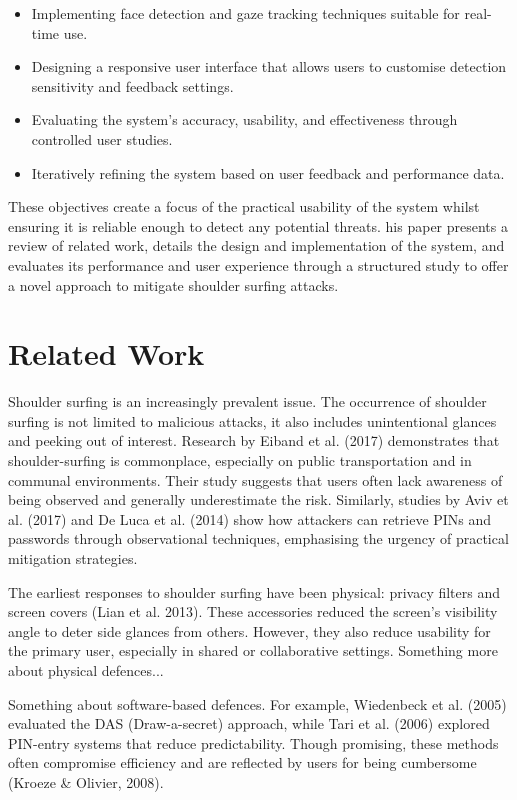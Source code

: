 \documentclass[12pt]{article}
\theoremstyle{plain}
\theoremstyle{definition}
\begin{document}
\begin{itemize}
  \item Implementing face detection and gaze tracking techniques suitable for real-time use.
  \item Designing a responsive user interface that allows users to customise detection sensitivity and feedback settings.
  \item Evaluating the system’s accuracy, usability, and effectiveness through controlled user studies.
  \item Iteratively refining the system based on user feedback and performance data.
\end{itemize}

These objectives create a focus of the practical usability of the system whilst ensuring it is reliable enough to detect any potential threats. his paper presents a review of related work, details the design and implementation of the system, and evaluates its performance and user experience through a structured study to offer a novel approach to mitigate shoulder surfing attacks.

\section{Related Work}
\label{sec:Related Work} 

Shoulder surfing is an increasingly prevalent issue. The occurrence of shoulder surfing is not limited to malicious attacks, it also includes unintentional glances and peeking out of interest. Research by Eiband et al. (2017) demonstrates that shoulder-surfing is commonplace, especially on public transportation and in communal environments. Their study suggests that users often lack awareness of being observed and generally underestimate the risk. Similarly, studies by Aviv et al. (2017) and De Luca et al. (2014) show how attackers can retrieve PINs and passwords through observational techniques, emphasising the urgency of practical mitigation strategies.

The earliest responses to shoulder surfing have been physical: privacy filters and screen covers (Lian et al. 2013). These accessories reduced the screen’s visibility angle to deter side glances from others. However, they also reduce usability for the primary user, especially in shared or collaborative settings. Something more about physical defences... 

Something about software-based defences. For example, Wiedenbeck et al. (2005) evaluated the DAS (Draw-a-secret) approach, while Tari et al. (2006) explored PIN-entry systems that reduce predictability. Though promising, these methods often compromise efficiency and are reflected by users for being cumbersome (Kroeze & Olivier, 2008).
\end{document}
